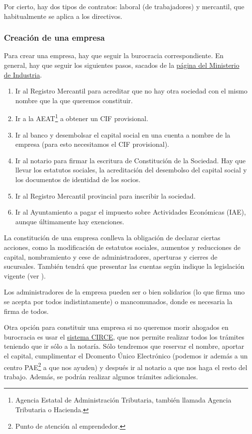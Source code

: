 \documentclass[nochap,palatino,notitlepage]{apuntes}
\begin{document}
Por cierto, hay dos tipos de contratos: laboral (de trabajadores) y mercantil, que habitualmente se aplica a los directivos.

\subsubsection{Creación de una empresa}

Para crear una empresa, hay que seguir la burocracia correspondiente. En general, hay que seguir los siguientes pasos, sacados de la \href{http://www.creatuempresa.org/es-ES/PasoApaso/}{página del Ministerio de Industria}.

\begin{enumerate}
\item Ir al Registro Mercantil para acreditar que no hay otra sociedad con el mismo nombre que la que queremos constituir.
\item Ir a la AEAT\footnote{Agencia Estatal de Administración Tributaria, también llamada Agencia Tributaria o Hacienda.} a obtener un CIF provisional.
\item Ir al banco y desembolsar el capital social en una cuenta a nombre de la empresa (para esto necesitamos el CIF provisional).
\item Ir al notario para firmar la escritura de Constitución de la Sociedad. Hay que llevar los estatutos sociales, la acreditación del desembolso del capital social y los documentos de identidad de los socios.
\item Ir al Registro Mercantil provincial para inscribir la sociedad.
\item Ir al Ayuntamiento a pagar el impuesto sobre Actividades Económicas (IAE), aunque últimamente hay exenciones.
\end{enumerate}

La constitución de una empresa conlleva la obligación de declarar ciertas acciones, como la modificación de estatutos sociales, aumentos y reducciones de capital, nombramiento y cese de administradores, aperturas y cierres de sucursales. También tendrá que presentar las cuentas según indique la legislación vigente (ver ).

Los administradores de la empresa pueden ser o bien solidarios (lo que firma uno se acepta por todos indistintamente) o mancomunados, donde es necesaria la firma de todos. %

Otra opción para constituir una empresa si no queremos morir ahogados en burocracia es usar el \href{http://www.creatuempresa.org/es-ES/PasoApaso/Paginas/etramitacion.aspx?cod=SRL&nombre=Sociedad%20de%20Responsabilidad%20Limitada&idioma=es-es}{sistema CIRCE}, que nos permite realizar todos los trámites teniendo que ir sólo a la notaría. Sólo tendremos que reservar el nombre, aportar el capital, cumplimentar el Dcomento Único Electrónico (podemos ir además a un centro PAE\footnote{Punto de atención al emprendedor.} a que nos ayuden) y después ir al notario a que nos haga el resto del trabajo. Además, se podrán realizar algunos trámites adicionales.
\end{document}
